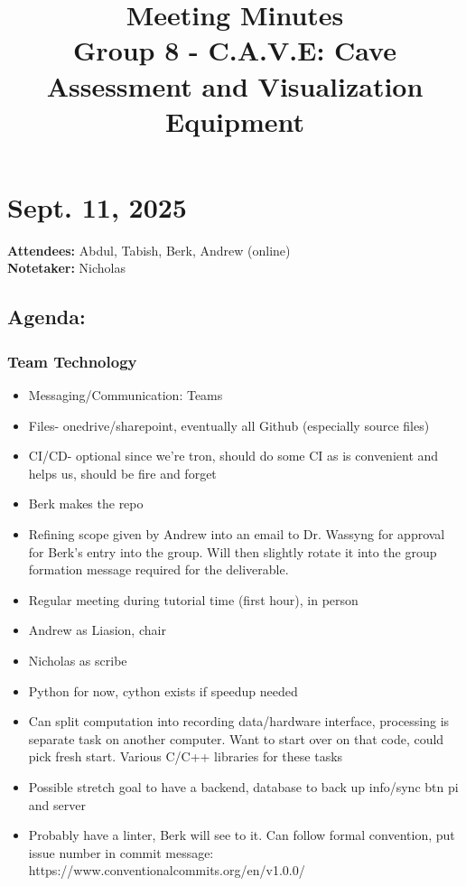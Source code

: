 \documentclass{article}
\title{\bf{Meeting Minutes} \\ \large{Group 8 - C.A.V.E: Cave Assessment and Visualization Equipment}}
\date{}
\author{}
\begin{document}
	\maketitle
	\newpage
	
	\section*{Sept. 11, 2025}

	\textbf{Attendees:} Abdul, Tabish, Berk, Andrew (online) \\
	\textbf{Notetaker:} Nicholas

		\subsection*{Agenda:}
			\subsubsection*{Team Technology}
			\begin{itemize}
				\item Messaging/Communication: Teams 
				\item Files- onedrive/sharepoint, eventually all Github (especially source files)
				\item CI/CD- optional since we’re tron, should do some CI as is convenient and helps us, should be fire and forget
				\item Berk makes the repo
				\item Refining scope given by Andrew into an email to Dr. Wassyng for approval for Berk’s entry into the group. Will then slightly rotate it into the group formation message required for the deliverable.
				\item Regular meeting during tutorial time (first hour), in person
				\item Andrew as Liasion, chair
				\item Nicholas as scribe
				\item Python for now, cython exists if speedup needed
				\item Can split computation into recording data/hardware interface, processing is separate task on another computer. Want to start over on that code, could pick fresh start. Various C/C++ libraries for these tasks
				\item Possible stretch goal to have a backend, database to back up info/sync btn pi and server
				\item Probably have a linter, Berk will see to it. Can follow formal convention, put issue number in commit message: https://www.conventionalcommits.org/en/v1.0.0/
			\end{itemize}
\end{document}
